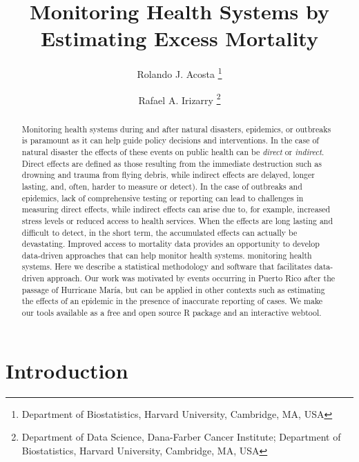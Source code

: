 \documentclass[11pt]{article}
\begin{document}
\title{Monitoring Health Systems by Estimating Excess Mortality}
 
\author{
{Rolando J. Acosta \footnote{Department of Biostatistics, Harvard University, Cambridge, MA, USA}} \and {Rafael A. Irizarry \footnote{Department of Data Science, Dana-Farber Cancer Institute; \newline Department of Biostatistics, Harvard University, Cambridge, MA, USA}}
}

\maketitle
\setcounter{page}{0}

\begin{abstract}
Monitoring health systems during and after natural disasters, epidemics, or outbreaks is paramount as it can help guide policy decisions and interventions. In the case of natural disaster the effects of these events on public health can be \textit{direct} or \textit{indirect}. Direct effects are defined as those resulting from the immediate destruction such as drowning and trauma from flying debris, while indirect effects are delayed, longer lasting, and, often, harder to measure or detect). In the case of outbreaks and epidemics, lack of comprehensive testing or reporting can lead to challenges in measuring direct effects, while indirect effects can arise due to, for example, increased stress levels or reduced access to health services. When the effects are long lasting and difficult to detect, in the short term, the accumulated effects can actually be devastating. Improved access to  mortality data provides an opportunity to develop data-driven approaches that can help monitor health systems. monitoring health systems. Here we describe a statistical methodology and software  that facilitates data-driven approach. Our work was motivated by events occurring in Puerto Rico after the passage of Hurricane Mar\'ia, but can be applied in other contexts such as estimating the effects of an epidemic in the presence of inaccurate reporting of cases. We make our tools available as a free and open source R package and an interactive webtool.
\end{abstract}

\newpage

\section{Introduction}
\label{sec:introduction}
\end{document}
